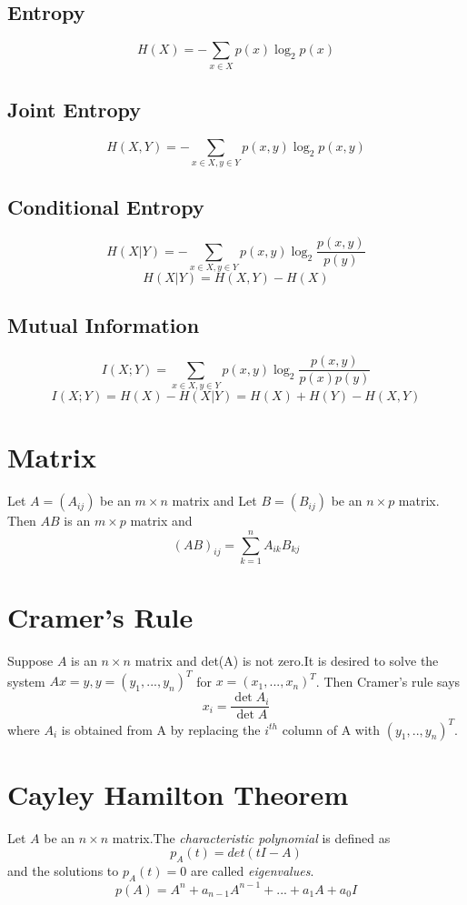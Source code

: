 \documentclass[twocolumn]{article}
\begin{document}
\subsection{Entropy}
\[H(X) = -\sum_{x \in X} p(x)\log_2p(x)\]

\subsection{Joint Entropy}
\[H(X,Y) = -\sum_{x \in X, y \in Y} p(x,y) \log_2p(x,y)\]

\subsection{Conditional Entropy}
\[H(X|Y) = -\sum_{x \in X, y \in Y} p(x,y) \log_2 \frac{p(x,y)}{p(y)}\]
\[H(X|Y) = H(X,Y) - H(X)\]

\subsection{Mutual Information}
\[I(X;Y) = \sum_{x \in X, y \in Y}p(x,y) \log_2 \frac{p(x,y)}{p(x)p(y)}\]
\[I(X;Y) = H(X) - H(X|Y) = H(X) + H(Y) - H(X,Y)\]

\section{Matrix}
Let $A = (A_{ij})$ be an $m \times n$ matrix and Let $B = (B_{ij})$ be an $n \times p$ matrix.
Then $AB$ is an $m \times p$ matrix and
\[
	(AB)_{ij} = \sum_{k=1}^n A_{ik}B_{kj}
\]

\section{Cramer's Rule}
Suppose $A$ is an $n \times n$ matrix and det(A) is not zero.It is desired to solve the system $Ax=y, y=(y_1,...,y_n)^T$ for $x = (x_1,...,x_n)^T$. Then Cramer's rule says
\[
	x_i = \frac{\det A_i}{\det A}
\]
where $A_i$ is obtained from A by replacing the $i^{th}$ column of A with $(y_1,..,y_n)^T$.

\section{Cayley Hamilton Theorem}
Let $A$ be an $n \times n$ matrix.The \emph{characteristic polynomial} is defined as
\[
	p_A(t) = det(tI - A)
\]
and the solutions to $p_A(t) = 0$ are called \emph{eigenvalues}.
\[
	p(A) = A^n + a_{n-1}A^{n-1} + ... + a_1A + a_0I
\]
\end{document}
